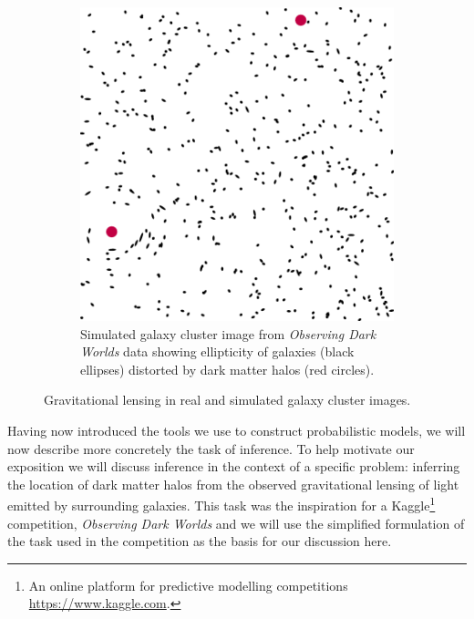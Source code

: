 \begin{figure}[!t]
\begin{subfigure}[b]{.46\linewidth}
\includegraphics[width=\textwidth]{images/simulated-galaxy-cluster}
\vskip 0pt
\caption{Simulated galaxy cluster image from \emph{Observing Dark Worlds} data \citep{kaggle2012observing} showing ellipticity of galaxies (black ellipses) distorted by dark matter halos (red circles).}
\label{sfig:gravitational-lensing-simulated}
\end{subfigure}%
\caption[Examples of gravitational lensing.]{Gravitational lensing in real and simulated galaxy cluster images.}
\label{fig:gravitational-lensing}
\end{figure}

Having now introduced the tools we use to construct probabilistic models, we will now describe more concretely the task of inference. To help motivate our exposition we will discuss inference in the context of a specific problem: inferring the location of dark matter halos from the observed gravitational lensing of light emitted by surrounding galaxies. This task was the inspiration for a Kaggle\footnote{An online platform for predictive modelling competitions \url{https://www.kaggle.com}.} competition, \emph{Observing Dark Worlds} \citep{kaggle2012observing,harvey2014observing} and we will use the simplified formulation of the task used in the competition as the basis for our discussion here.%

